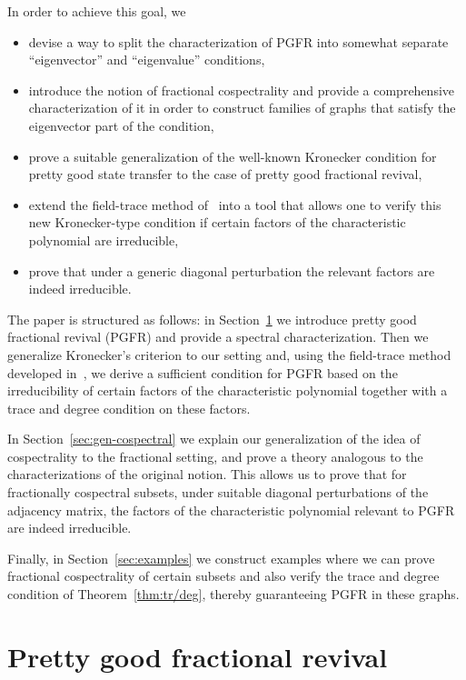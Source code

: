 \documentclass[11pt]{article}
\theoremstyle{definition}
\numberwithin{equation}{section}
\newcommand\+{\mkern2mu}
\newcommand{\1}{\mathbf 1}
\begin{document}
In order to achieve this goal, we
\begin{itemize}
\item devise a way to split the characterization of PGFR into somewhat separate ``eigenvector'' and ``eigenvalue'' conditions,
\item introduce the notion of fractional cospectrality and provide a comprehensive characterization of it in order to construct families of graphs that satisfy the eigenvector part of the condition,
\item prove a suitable generalization of the well-known Kronecker condition for pretty good state transfer to the case of pretty good fractional revival,
\item extend the field-trace method of~\cite{invol} into a tool that allows one to verify this new Kronecker-type condition if certain factors of the characteristic polynomial are irreducible,
\item prove that under a generic diagonal perturbation the relevant factors are indeed irreducible. 
\end{itemize}

The paper is structured as follows: in Section~\ref{sec:pgfr} we introduce pretty good fractional revival (PGFR) and provide a spectral characterization. Then we generalize Kronecker's criterion to our setting and, using the field-trace method developed in~\cite{invol}, we derive a sufficient condition for PGFR based on the irreducibility of certain factors of the characteristic polynomial together with a trace and degree condition on these factors.

In Section~\ref{sec:gen-cospectral} we explain our generalization of the idea of cospectrality to the fractional setting, and prove a theory analogous to the characterizations of the original notion. This allows us to prove that for fractionally cospectral subsets, under suitable diagonal perturbations of the adjacency matrix, the factors of the characteristic polynomial relevant to PGFR are indeed irreducible. 

Finally, in Section~\ref{sec:examples} we construct examples where we can prove fractional cospectrality of certain subsets and also verify the trace and degree condition of Theorem~\ref{thm:tr/deg}, thereby guaranteeing PGFR in these graphs.

\section{Pretty good fractional revival}\label{sec:pgfr}
\end{document}
